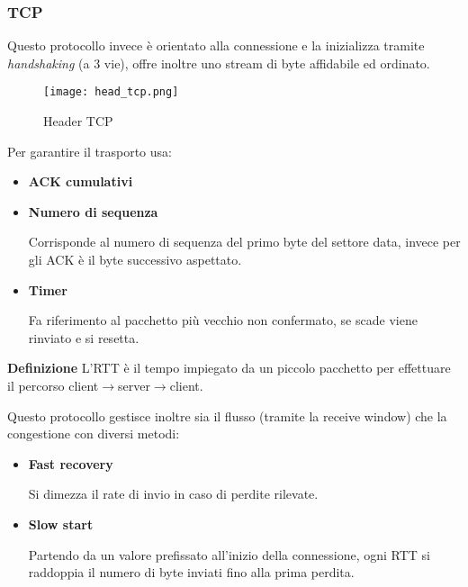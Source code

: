 \documentclass{article}
\begin{document}
\subsubsection{TCP}

Questo protocollo invece è orientato alla connessione e la inizializza tramite \textit{handshaking} (a 3 vie), offre inoltre uno stream di byte affidabile ed ordinato.\newline

\begin{figure}[ht]
    \centering
    \texttt{[image: head\_tcp.png]}
    \caption{Header TCP}
    \label{fig:head_tcp}
\end{figure}

\noindent Per garantire il trasporto usa:
\begin{itemize}
    \item \textbf{ACK cumulativi}
    \item \textbf{Numero di sequenza}

        Corrisponde al numero di sequenza del primo byte del settore data, invece per gli ACK è il byte successivo aspettato.
    
    \item \textbf{Timer}

        Fa riferimento al pacchetto più vecchio non confermato, se scade viene rinviato e si resetta.\newline
    
\end{itemize}

\noindent\textbf{Definizione} L'RTT è il tempo impiegato da un piccolo pacchetto per effettuare il percorso client$\rightarrow$server$\rightarrow$client.\newline

\noindent Questo protocollo gestisce inoltre sia il flusso (tramite la receive window) che la congestione con diversi metodi:
\begin{itemize}
    \item \textbf{Fast recovery}

        Si dimezza il rate di invio in caso di perdite rilevate.
    
    \item \textbf{Slow start}

        Partendo da un valore prefissato all'inizio della connessione, ogni RTT si raddoppia il numero di byte inviati fino alla prima perdita.\newline

\end{itemize}
\end{document}
